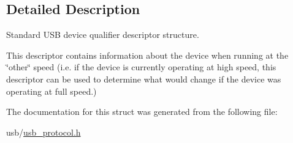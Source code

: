 \subsection{Detailed Description}
Standard U\+SB device qualifier descriptor structure. 

This descriptor contains information about the device when running at the \char`\"{}other\char`\"{} speed (i.\+e. if the device is currently operating at high speed, this descriptor can be used to determine what would change if the device was operating at full speed.) 

The documentation for this struct was generated from the following file\+:\begin{DoxyCompactItemize}
\item 
usb/\hyperlink{usb__protocol_8h}{usb\+\_\+protocol.\+h}\end{DoxyCompactItemize}
